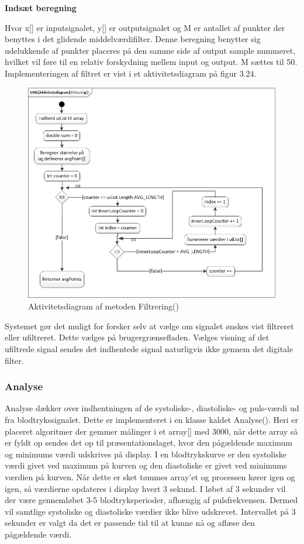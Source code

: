 \textbf{Indsæt beregning}

Hvor x[] er inputsignalet, y[] er outputsignalet og M er antallet af punkter der benyttes i det glidende middelværdifilter. Denne beregning benytter sig udelukkende af punkter placeres på den samme side af output sample nummeret, hvilket vil føre til en relativ forskydning mellem input og output. M sættes til 50. Implementeringen af filtret er vist i et aktivitetsdiagram på figur 3.24.
\begin{figure}[H]
	\centering
	\includegraphics[width=1.0\textwidth]{Figurer/AktFiltrering}
	\caption{Aktivitetsdiagram af metoden Filtrering()}
\end{figure}
Systemet gør det muligt for forsker selv at vælge om signalet ønskes vist filtreret eller ufiltreret. Dette vælges på brugergrænsefladen. Vælges visning af det ufiltrede signal sendes det indhentede signal naturligvis ikke gennem det digitale filter. 

\subsubsection{Analyse}
Analyse dækker over indhentningen af de systoliske-, diastoliske- og puls-værdi ud fra blodtrykssignalet. Dette er implementeret i en klasse kaldet Analyse(). Heri er placeret algoritmer der gemmer målinger i et array[] med 3000, når dette array så er fyldt op sendes det op til præsentationslaget, hvor den pågældende maximum og minimums værdi udskrives på display. I en blodtrykskurve er den systoliske værdi givet ved maximum på kurven og den diastoliske er givet ved minimums værdien på kurven. Når dette er sket tømmes array’et og processen kører igen og igen, så værdierne opdateres i display hvert 3 sekund. I løbet af 3 sekunder vil der være gennemløbet 3-5 blodtryksperioder, afhængig af pulsfrekvensen. Dermed vil samtlige systoliske og diastoliske værdier ikke blive udskrevet. Intervallet på 3 sekunder er valgt da det er passende tid til at kunne nå og aflæse den pågældende værdi.

